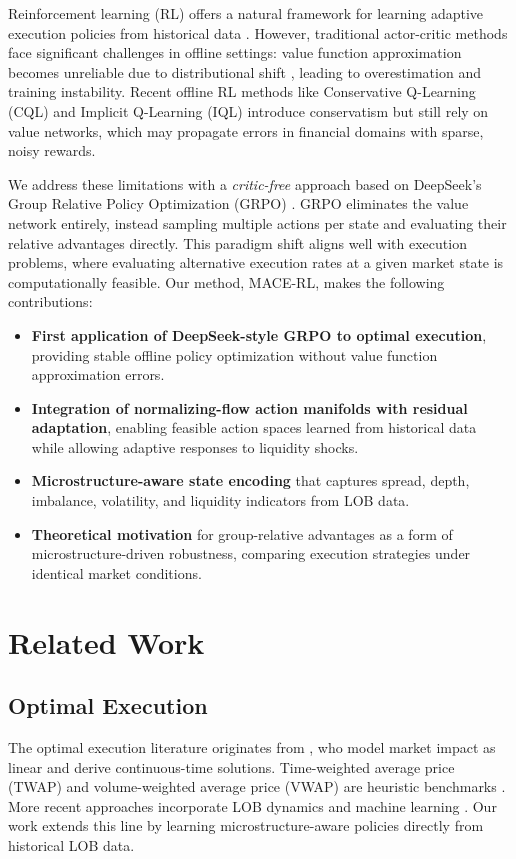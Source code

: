 \documentclass{article}
\begin{document}
Reinforcement learning (RL) offers a natural framework for learning adaptive execution policies from historical data \citep{neuneier1998optimal, nevmyvaka2006reinforcement}. However, traditional actor-critic methods face significant challenges in offline settings: value function approximation becomes unreliable due to distributional shift \citep{fujimoto2019off}, leading to overestimation and training instability. Recent offline RL methods like Conservative Q-Learning (CQL) \citep{kumar2020conservative} and Implicit Q-Learning (IQL) \citep{kostrikov2022offline} introduce conservatism but still rely on value networks, which may propagate errors in financial domains with sparse, noisy rewards.

We address these limitations with a \textit{critic-free} approach based on DeepSeek's Group Relative Policy Optimization (GRPO) \citep{deepseek2024grpo}. GRPO eliminates the value network entirely, instead sampling multiple actions per state and evaluating their relative advantages directly. This paradigm shift aligns well with execution problems, where evaluating alternative execution rates at a given market state is computationally feasible. Our method, MACE-RL, makes the following contributions:

\begin{itemize}
    \item \textbf{First application of DeepSeek-style GRPO to optimal execution}, providing stable offline policy optimization without value function approximation errors.
    \item \textbf{Integration of normalizing-flow action manifolds with residual adaptation}, enabling feasible action spaces learned from historical data while allowing adaptive responses to liquidity shocks.
    \item \textbf{Microstructure-aware state encoding} that captures spread, depth, imbalance, volatility, and liquidity indicators from LOB data.
    \item \textbf{Theoretical motivation} for group-relative advantages as a form of microstructure-driven robustness, comparing execution strategies under identical market conditions.
\end{itemize}

\section{Related Work}

\subsection{Optimal Execution}
The optimal execution literature originates from \citet{almgren2001optimal}, who model market impact as linear and derive continuous-time solutions. Time-weighted average price (TWAP) and volume-weighted average price (VWAP) are heuristic benchmarks \citep{bergault2021multi}. More recent approaches incorporate LOB dynamics \citep{cartea2015algorithmic} and machine learning \citep{lim2020reinforcement}. Our work extends this line by learning microstructure-aware policies directly from historical LOB data.
\end{document}
